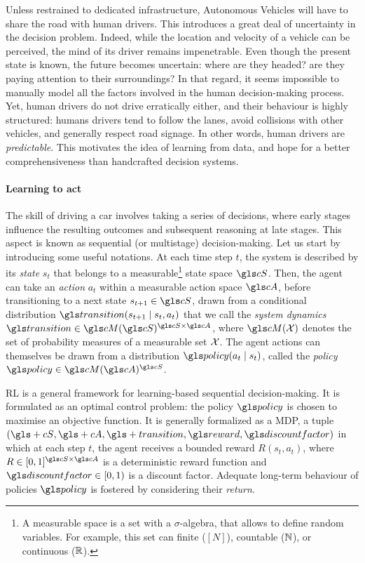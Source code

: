 Unless restrained to dedicated infrastructure, Autonomous Vehicles will have to share the road with human drivers. This introduces a great deal of uncertainty in the decision problem. Indeed, while the location and velocity of a vehicle can be perceived, the mind of its driver remains impenetrable. Even though the present state is known, the future becomes uncertain: where are they headed? are they paying attention to their surroundings? In that regard, it seems impossible to manually model all the factors involved in the human decision-making process. Yet, human drivers do not drive erratically either, and their behaviour is highly structured: humans drivers tend to follow the lanes, avoid collisions with other vehicles, and generally respect road signage. In other words, human drivers are \emph{predictable}. This motivates the idea of learning from data, and hope for a better comprehensiveness than handcrafted decision systems.%

\paragraph{Learning to act}

The skill of driving a car involves taking a series of decisions, where early stages influence the resulting outcomes and subsequent reasoning at late stages. This aspect is known as sequential (or multistage) decision-making. Let us start by introducing some useful notations. At each time step $t$, the system is described by its \emph{state} $s_t$ that belongs to a measurable\footnote{A measurable space is a set with a $\sigma$-algebra, that allows to define random variables. For example, this set can finite ($[N]$), countable ($\mathbb{N}$), or continuous ($\mathbb{R}$).} state space $\cS$. Then, the agent can take an \emph{action} $a_t$ within a measurable action space $\cA$, before transitioning to a next state $s_{t+1}\in\cS$, drawn from a conditional distribution $\Ps\parentheses{s_{t+1} \mid s_t, a_t}$ that we call the \emph{system dynamics} $\Ps\in\cM(\cS)^{\cS\times\cA}$, where $\cM(\cX)$ denotes the set of probability measures of a measurable set $\mathcal{X}$. The agent actions can themselves be drawn from a distribution $\policy\parentheses{a_t\mid s_t}$, called the \emph{policy} $\policy\in\cM(\cA)^{\cS}$.

\gls{RL} is a general framework for learning-based sequential decision-making. It is formulated as an optimal control problem: the policy $\policy$ is chosen to maximise an objective function. It is generally formalized as a \gls{MDP}, \ie a tuple $(\gls+{cS}, \gls+{cA}, \gls+{transition}, \R, \discount)$ in which at each step $t$, the agent receives a bounded reward $R(s_t, a_t)$, where $R\in[0, 1]^{\cS\times\cA}$ is a deterministic reward function and $\discount\in[0,1)$ is a discount factor. Adequate long-term behaviour of policies $\policy$ is fostered by considering their \emph{return}.

